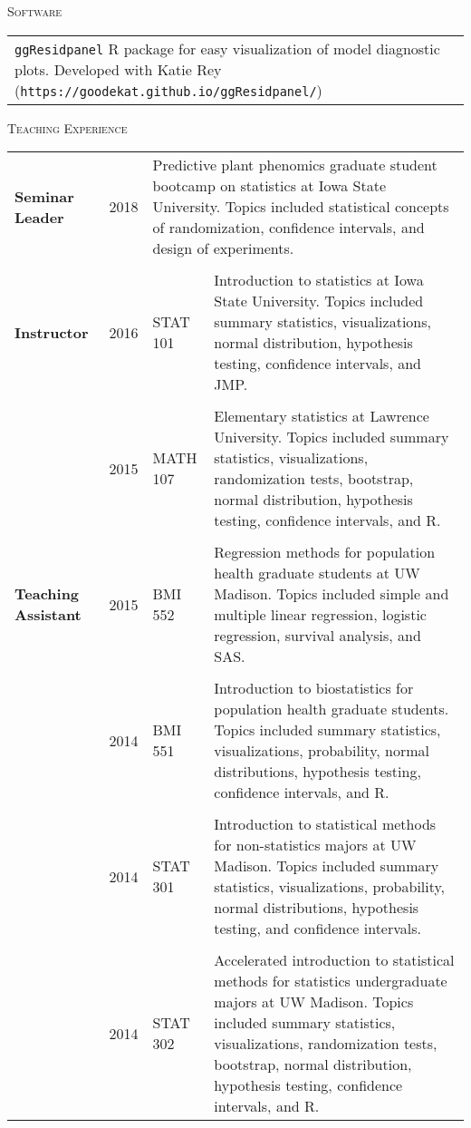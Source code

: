 \documentclass[11pt, oneside]{article}
\begin{document}
\noindent \textsc{Software} \hrulefill
\begin{longtable}{p{16.5cm}}
\texttt{ggResidpanel} R package for easy visualization of model diagnostic plots. Developed with Katie Rey (\texttt{https://goodekat.github.io/ggResidpanel/})
\end{longtable}

\noindent \textsc{Teaching Experience} \hrulefill

\begin{longtable}{p{2cm}p{1cm}p{2cm}p{11.5cm}}
\textbf{Seminar Leader} & \hfill{2018} & \multicolumn{2}{p{13.5cm}}{Predictive plant phenomics graduate student bootcamp on statistics at Iowa State University. Topics included statistical concepts of randomization, confidence intervals, and design of experiments.}\\
\\
\textbf{Instructor} & \hfill{2016} & STAT 101 & Introduction to statistics at Iowa State University. Topics included summary statistics, visualizations, normal distribution, hypothesis testing, confidence intervals, and JMP.\\
\\
& \hfill{2015} & MATH 107 & Elementary statistics at Lawrence University. Topics included summary statistics, visualizations, randomization tests, bootstrap, normal distribution, hypothesis testing, confidence intervals, and R.\\
\\
\textbf{Teaching Assistant} & \hfill{2015} & BMI 552 & Regression methods for population health graduate students at UW Madison. Topics included simple and multiple linear regression, logistic regression, survival analysis, and SAS.\\
\\
& \hfill{2014} & BMI 551 & Introduction to biostatistics for population health graduate students. Topics included summary statistics, visualizations, probability, normal distributions, hypothesis testing, confidence intervals, and R.\\
\\
& \hfill{2014} & STAT 301 & Introduction to statistical methods for non-statistics majors at UW Madison. Topics included summary statistics, visualizations, probability, normal distributions, hypothesis testing, and confidence intervals.\\
\\
& \hfill{2014} & STAT 302 & Accelerated introduction to statistical methods for statistics undergraduate majors at UW Madison. Topics included summary statistics, visualizations, randomization tests, bootstrap, normal distribution, hypothesis testing, confidence intervals, and R.\\

\end{longtable}
\end{document}
